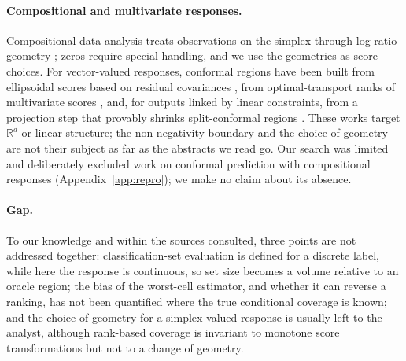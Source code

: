 \paragraph{Compositional and multivariate responses.}
Compositional data analysis treats observations on the simplex through log-ratio geometry \citep{aitchison1982statistical,aitchison1986statistical}; zeros require special handling, and we use the geometries as score choices.
For vector-valued responses, conformal regions have been built from ellipsoidal scores based on residual covariances \citep{henderson2024ellipsoids}, from optimal-transport ranks of multivariate scores \citep{klein2025multivariate}, and, for outputs linked by linear constraints, from a projection step that provably shrinks split-conformal regions \citep{principato2024hierarchical}.
These works target $\mathbb R^d$ or linear structure; the non-negativity boundary and the choice of geometry are not their subject as far as the abstracts we read go.
Our search was limited and deliberately excluded work on conformal prediction with compositional responses (Appendix~\ref{app:repro}); we make no claim about its absence.

\paragraph{Gap.}
To our knowledge and within the sources consulted, three points are not addressed together: classification-set evaluation is defined for a discrete label, while here the response is continuous, so set size becomes a volume relative to an oracle region; the bias of the worst-cell estimator, and whether it can reverse a ranking, has not been quantified where the true conditional coverage is known; and the choice of geometry for a simplex-valued response is usually left to the analyst, although rank-based coverage is invariant to monotone score transformations but not to a change of geometry.
